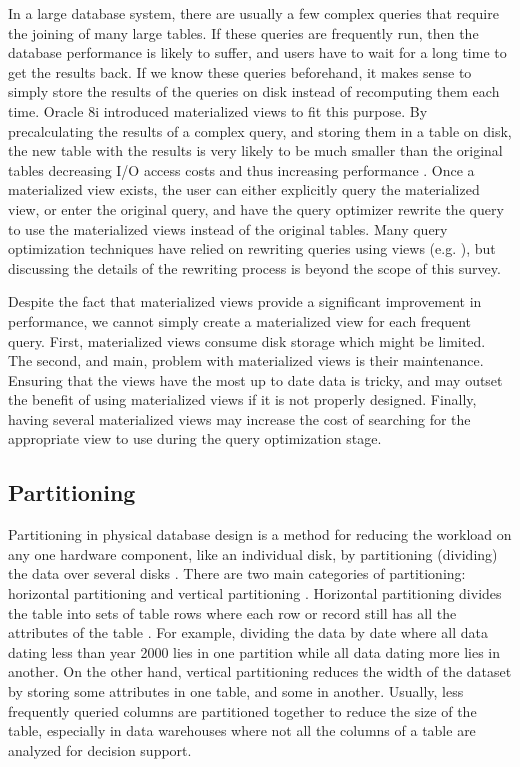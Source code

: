 \documentclass[12pt,a4paper]{article}
\begin{document}
In a large database system, there are usually a few complex queries that require the joining of many large tables. If these queries are frequently run, then the
database performance is likely to suffer, and users have to wait for a long time to get the results back. If we know these queries beforehand, it makes sense to
simply store the results of the queries on disk instead of recomputing them each time. Oracle 8i introduced materialized views to fit this purpose. By
precalculating the results of a complex query, and storing them in a table on disk, the new table with the results is very likely to be much smaller than the
original tables decreasing I/O access costs and thus increasing performance \cite{lightstone2007physical, chaudhuri1998overview}. Once a materialized view
exists, the user can either explicitly query the materialized view, or enter the original query, and have the query optimizer rewrite the query to use the
materialized views instead of the original tables. Many query optimization techniques have relied on rewriting queries using views (e.g.
\cite{levy1995answering, gupta1995aggregate, goldstein2001optimizing, abiteboul1998complexity}), but discussing the details of the rewriting process is beyond
the scope of this survey.

Despite the fact that materialized views provide a significant improvement in performance, we cannot simply create a materialized view for each frequent query.
First, materialized views consume disk storage which might be limited. The second, and main, problem with materialized views is their maintenance. Ensuring that
the views have the most up to date data is tricky, and may outset the benefit of using materialized views if it is not properly designed. Finally, having
several materialized views may increase the cost of searching for the appropriate view to use during the query optimization stage.

\subsection{Partitioning}

Partitioning in physical database design is a method for reducing the workload on any one hardware component, like an individual disk, by partitioning
(dividing) the data over several disks \cite{lightstone2007physical}. There are two main categories of partitioning: horizontal partitioning and vertical
partitioning \cite{agrawal2004integrating}. Horizontal partitioning divides the table into sets of table rows where each row or record still has all the
attributes of the table \cite{ceri1982horizontal, shin1985partitioning}. For example, dividing the data by date where all data dating less than year 2000 lies
in one partition while all data dating more lies in another. On the other hand, vertical partitioning reduces the width of the dataset by storing some
attributes in one table, and some in another. Usually, less frequently queried columns are partitioned together to reduce the size of the table, especially in
data warehouses where not all the columns of a table are analyzed for decision support.
\end{document}
